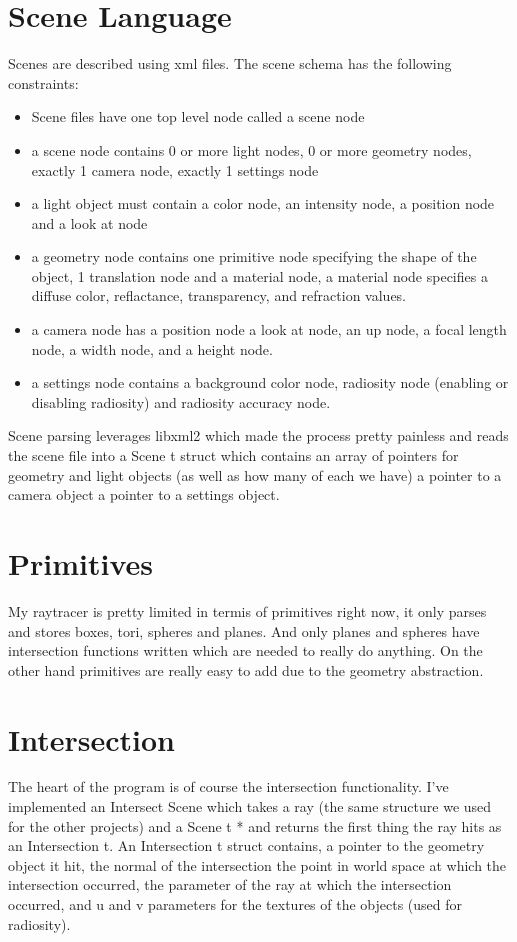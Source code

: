 \documentclass{article}
\begin{document}
\section{Scene Language}
Scenes are described using xml files. The scene schema has the following constraints:
\begin{itemize}
\item Scene files have one top level node called a scene node
\item a scene node contains 0 or more light nodes, 0 or more geometry nodes, exactly 1 camera node, exactly 1 settings node
\item a light object must contain a color node, an intensity node, a position node and a look at node
\item a geometry node contains one primitive node specifying the shape of the object, 1 translation node and a material node, a material node specifies a diffuse color, reflactance, transparency, and refraction values.
\item a camera node has a position node a look at node, an up node, a focal length node, a width node, and a height node.
\item a settings node contains a background color node, radiosity node (enabling or disabling radiosity) and radiosity accuracy node.
\end{itemize}

    Scene parsing leverages libxml2 which made the process pretty painless and reads the scene file into a Scene t struct which contains an array of pointers for geometry and light objects (as well as how many of each we have) a pointer to a camera object a pointer to a settings object.

\section{Primitives}
My raytracer is pretty limited in termis of primitives right now, it only parses and stores boxes, tori, spheres and planes. And only planes and spheres have intersection functions written which are needed to really do anything. On the other hand primitives are really easy to add due to the geometry abstraction.

\section{Intersection}
The heart of the program is of course the intersection functionality. I've implemented an Intersect Scene which takes a ray (the same structure we used for the other projects) and a Scene t * and returns the first thing the ray hits as an Intersection t. An Intersection t struct contains, a pointer to the geometry object it hit, the normal of the intersection the point in world space at which the intersection occurred, the parameter of the ray at which the intersection occurred, and u and v parameters for the textures of the objects (used for radiosity).
\end{document}
